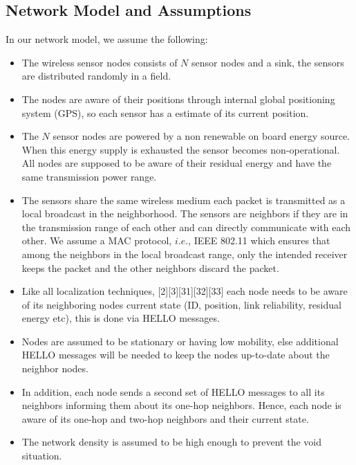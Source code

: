 \documentclass[fleqn,twoside]{article}
\begin{document}
\subsection{Network Model and Assumptions}
In our network model, we assume the following:
\begin{itemize}
  \item The wireless sensor nodes consists of $N$ sensor nodes and a sink, the sensors are distributed randomly in a field.
  \item The nodes are aware of their positions through internal global positioning system (GPS), so each sensor has a estimate of its current position.
  \item The $N$ sensor nodes are powered by a non renewable on board energy source. When this energy supply is exhausted the sensor becomes non-operational. All 
  nodes are supposed to be aware of their residual energy and have the same transmission power range.
  \item The sensors share the same wireless medium each packet is transmitted as a local broadcast in the neighborhood. The sensors are neighbors if they are in
  the transmission range of each other and can directly communicate with each other. We assume a MAC protocol, $i.e.$, IEEE 802.11 which ensures that among
  the neighbors in the local broadcast range, only the intended receiver keeps the packet and the other neighbors discard the packet.
  \item Like all localization techniques, [2][3][31][32][33] each node needs to be aware of its 
  neighboring nodes current state (ID, position, link reliability, residual energy etc), this is done via HELLO messages. 
  \item Nodes are assumed to be stationary or having low mobility, else additional HELLO messages will be needed
  to keep the nodes up-to-date about the neighbor nodes.
  \item In addition, each node sends a second set of HELLO messages to all its neighbors informing them about its one-hop neighbors. 
  Hence, each node is aware of its one-hop and two-hop neighbors and their current state.
  \item The network density is assumed to be high enough to prevent the void situation.
\end{itemize}
\end{document}
